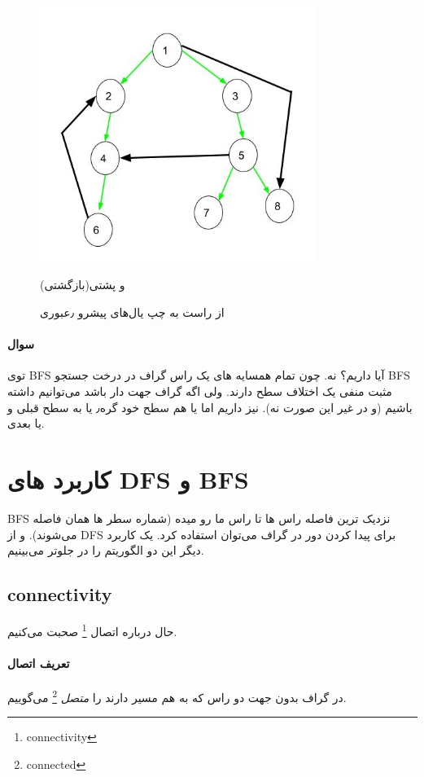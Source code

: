 \begin{figure}[b!]
\centering
\includegraphics[width=90mm]{s3.jpeg}
\caption{
از راست به چپ
یال‌های  پیشرو
٫عبوری
}
و
 پشتی(بازگشتی)

\end{figure}

\paragraph{سوال}
 توی BFS آیا 
  داریم؟ نه. 	چون تمام همسایه های یک راس گراف در درخت جستجو BFS مثبت منفی یک اختلاف سطح دارند. ولی 
 اگه گراف جهت دار باشد می‌توانیم داشته باشیم (و در غیر این صورت نه).
  نیز داریم اما یا هم‌ سطح خود گره٫ یا به سطح قبلی و یا بعدی.

\section{
کاربرد های DFS و BFS
}
BFS نزدیک ترین فاصله راس ها تا راس ما رو میده (شماره سطر ها همان فاصله می‌شوند).
 و از
DFS
برای پیدا کردن دور در گراف می‌توان استفاده کرد.
یک کاربرد دیگر این دو الگوریتم را در جلوتر می‌بینیم.

\subsection{connectivity}

حال درباره اتصال
\footnote{connectivity}
 صحبت می‌کنیم.

\paragraph{تعریف اتصال}
در گراف بدون جهت دو راس که به هم مسیر دارند را 
\textit{متصل} 
\footnote{connected}
می‌گوییم.

